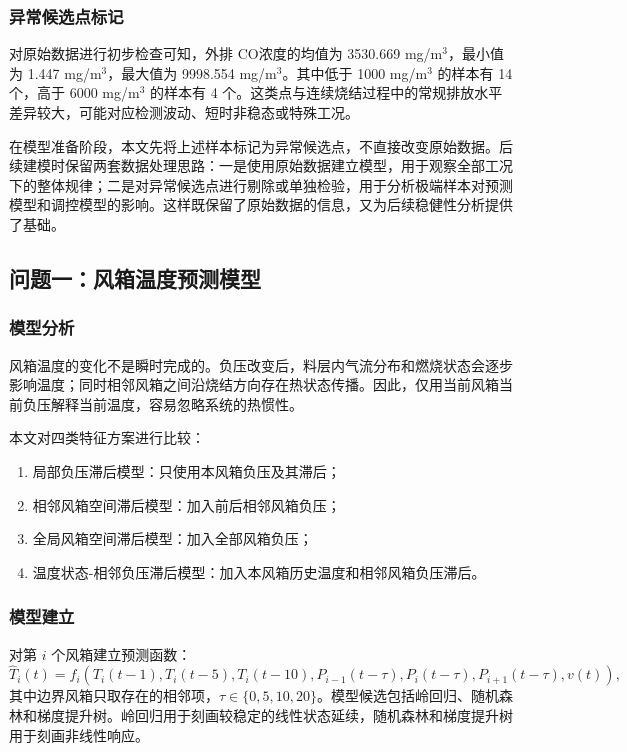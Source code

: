 \documentclass[UTF8,a4paper,zihao=-4]{ctexart}
\newcommand{\CO}{CO}
\begin{document}
\subsubsection{异常候选点标记}

对原始数据进行初步检查可知，外排 \CO 浓度的均值为 3530.669 mg/m$^3$，最小值为 1.447 mg/m$^3$，最大值为 9998.554 mg/m$^3$。其中低于 1000 mg/m$^3$ 的样本有 14 个，高于 6000 mg/m$^3$ 的样本有 4 个。这类点与连续烧结过程中的常规排放水平差异较大，可能对应检测波动、短时非稳态或特殊工况。

在模型准备阶段，本文先将上述样本标记为异常候选点，不直接改变原始数据。后续建模时保留两套数据处理思路：一是使用原始数据建立模型，用于观察全部工况下的整体规律；二是对异常候选点进行剔除或单独检验，用于分析极端样本对预测模型和调控模型的影响。这样既保留了原始数据的信息，又为后续稳健性分析提供了基础。

\subsection{问题一：风箱温度预测模型}

\subsubsection{模型分析}

风箱温度的变化不是瞬时完成的。负压改变后，料层内气流分布和燃烧状态会逐步影响温度；同时相邻风箱之间沿烧结方向存在热状态传播。因此，仅用当前风箱当前负压解释当前温度，容易忽略系统的热惯性。

本文对四类特征方案进行比较：

\begin{enumerate}
  \item 局部负压滞后模型：只使用本风箱负压及其滞后；
  \item 相邻风箱空间滞后模型：加入前后相邻风箱负压；
  \item 全局风箱空间滞后模型：加入全部风箱负压；
  \item 温度状态-相邻负压滞后模型：加入本风箱历史温度和相邻风箱负压滞后。
\end{enumerate}

\subsubsection{模型建立}

对第 $i$ 个风箱建立预测函数：
\begin{equation}
\hat T_i(t)=f_i\left(T_i(t-1),T_i(t-5),T_i(t-10),P_{i-1}(t-\tau),P_i(t-\tau),P_{i+1}(t-\tau),v(t)\right),
\end{equation}
其中边界风箱只取存在的相邻项，$\tau\in\{0,5,10,20\}$。模型候选包括岭回归、随机森林和梯度提升树。岭回归用于刻画较稳定的线性状态延续，随机森林和梯度提升树用于刻画非线性响应\cite{breiman2001random,friedman2001greedy}。
\end{document}
